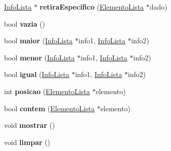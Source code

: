 \begin{DoxyCompactItemize}
\item 
\hypertarget{classListaDupla_abce743f2707be52064bf3bc7a0a0fc70}{\hyperlink{classInfoLista}{\-Info\-Lista} $\ast$ {\bfseries retira\-Especifico} (\hyperlink{classElementoLista}{\-Elemento\-Lista} $\ast$dado)}\label{classListaDupla_abce743f2707be52064bf3bc7a0a0fc70}

\item 
\hypertarget{classListaDupla_a5e92e115d759425a7b250d148f912848}{bool {\bfseries vazia} ()}\label{classListaDupla_a5e92e115d759425a7b250d148f912848}

\item 
\hypertarget{classListaDupla_a093a18336bc22c6dc4a98be27f7ae578}{bool {\bfseries maior} (\hyperlink{classInfoLista}{\-Info\-Lista} $\ast$info1, \hyperlink{classInfoLista}{\-Info\-Lista} $\ast$info2)}\label{classListaDupla_a093a18336bc22c6dc4a98be27f7ae578}

\item 
\hypertarget{classListaDupla_a7fdd5e0e8e2eb5db0d55d2c7382f83c5}{bool {\bfseries menor} (\hyperlink{classInfoLista}{\-Info\-Lista} $\ast$info1, \hyperlink{classInfoLista}{\-Info\-Lista} $\ast$info2)}\label{classListaDupla_a7fdd5e0e8e2eb5db0d55d2c7382f83c5}

\item 
\hypertarget{classListaDupla_a85fc71cdba8b1e0d4dbf5ef58665873c}{bool {\bfseries igual} (\hyperlink{classInfoLista}{\-Info\-Lista} $\ast$info1, \hyperlink{classInfoLista}{\-Info\-Lista} $\ast$info2)}\label{classListaDupla_a85fc71cdba8b1e0d4dbf5ef58665873c}

\item 
\hypertarget{classListaDupla_a0e7323f48caf95db1c1abd830bdcd1ce}{int {\bfseries posicao} (\hyperlink{classElementoLista}{\-Elemento\-Lista} $\ast$elemento)}\label{classListaDupla_a0e7323f48caf95db1c1abd830bdcd1ce}

\item 
\hypertarget{classListaDupla_a687e0148098871879cd71452e27eedea}{bool {\bfseries contem} (\hyperlink{classElementoLista}{\-Elemento\-Lista} $\ast$elemento)}\label{classListaDupla_a687e0148098871879cd71452e27eedea}

\item 
\hypertarget{classListaDupla_aa00cb9c352e3843967388ef04d4c2c42}{void {\bfseries mostrar} ()}\label{classListaDupla_aa00cb9c352e3843967388ef04d4c2c42}

\item 
\hypertarget{classListaDupla_abfef1d092f78fb6862087097d809f1e7}{void {\bfseries limpar} ()}\label{classListaDupla_abfef1d092f78fb6862087097d809f1e7}

\end{DoxyCompactItemize}
